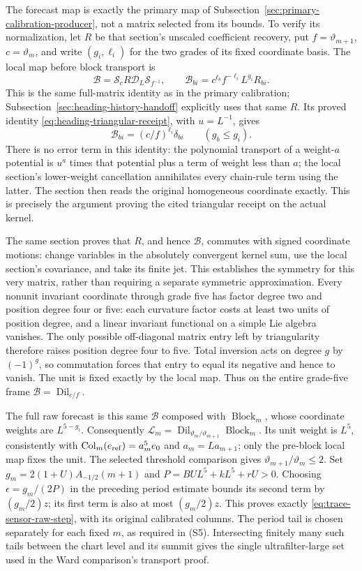 The forecast map is exactly the primary map of
Subsection~\ref{sec:primary-calibration-producer}, not a matrix selected
from its bounds. To verify its normalization, let $R$ be that section's
unscaled coefficient recovery, put $f=\vartheta_{m+1}$,
$c=\vartheta_m$, and write $(g_i,\ell_i)$ for the two grades of its
fixed coordinate basis. The local map before block transport is
\[
 \mathscr B=\mathscr S_c R\mathscr D_L\mathscr S_{f^{-1}},
 \qquad \mathscr B_{bi}=c^{\ell_b}f^{-\ell_i}L^{g_i}R_{bi}.
\]
This is the same full-matrix identity as in the primary calibration;
Subsection~\ref{sec:heading-history-handoff} explicitly uses that same
$R$. Its proved identity \eqref{eq:heading-triangular-receipt}, with
$u=L^{-1}$, gives
\[
 \mathscr B_{bi}=(c/f)^{\ell_i}\delta_{bi}\qquad(g_b\le g_i).
\]
There is no error term in this identity: the polynomial transport of
a weight-$a$ potential is $u^a$ times that potential plus a term of
weight less than $a$; the local section's lower-weight cancellation
annihilates every chain-rule term using the latter. The section then
reads the original homogeneous coordinate exactly. This is precisely
the argument proving the cited triangular receipt on the actual kernel.

The same section proves that $R$, and hence $\mathscr B$, commutes with signed
coordinate motions: change variables in the absolutely convergent
kernel sum, use the local section's covariance, and take its finite
jet. This establishes the symmetry for this very matrix, rather than
requiring a separate symmetric approximation. Every nonunit invariant
coordinate through grade five has factor degree two and position
degree four or five: each curvature factor costs at least two units
of position degree, and a linear invariant functional on a simple
Lie algebra vanishes. The only possible off-diagonal matrix entry left
by triangularity therefore raises position degree four to five.
Total inversion acts on degree $g$ by $(-1)^g$, so commutation forces
that entry to equal its negative and hence to vanish. The unit is
fixed exactly by the local map. Thus on the entire grade-five frame
$\mathscr B=\operatorname{Dil}_{c/f}$.

The full raw forecast is this same $\mathscr B$ composed with
$\operatorname{Block}_m$, whose coordinate weights are $L^{5-g_i}$.
Consequently
$\mathcal L_m=\operatorname{Dil}_{\vartheta_m/\vartheta_{m+1}}
\operatorname{Block}_m$. Its unit weight is $L^5$, consistently with
$\operatorname{Col}_m(e_{\rm ref})=a_m^5e_0$ and
$a_m=L a_{m+1}$; only the pre-block local map fixes the unit.
The selected threshold comparison gives
$\vartheta_{m+1}/\vartheta_m\le2$.
Set $g_m=2(1+U)A_{-1/2}(m+1)$ and
$P=BUL^5+kL^5+rU>0$. Choosing $\epsilon=g_m/(2P)$ in the preceding
period estimate bounds its second term by $(g_m/2)z$; its first term
is also at most $(g_m/2)z$. This proves exactly
\eqref{eq:trace-sensor-raw-step}, with its original calibrated columns.
The period tail is chosen separately for each fixed $m$, as required
in (S5). Intersecting finitely many such tails between the chart level
and its summit gives the single ultrafilter-large set used in the
Ward comparison's transport proof.

